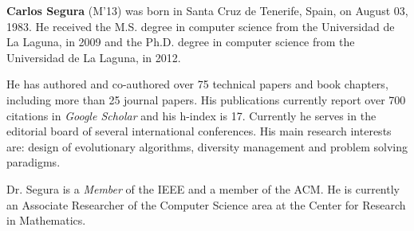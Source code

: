 \documentclass[journal]{IEEEtran}
\begin{document}




%



% 


\begin{IEEEbiography}{\bf Carlos Segura} (M'13) was born in Santa Cruz de Tenerife, Spain, on August 03, 1983.
He received the M.S. degree in computer science from the Universidad de La Laguna, in 2009 and the Ph.D. degree in computer science from the Universidad de La Laguna, in 2012.

He has authored and co-authored over 75 technical papers and book chapters, including more than 25 journal papers.
His publications currently report over 700 citations in {\em Google Scholar} and his h-index is 17. Currently he serves in the editorial board of several international conferences.
His main research interests are: design of evolutionary algorithms, diversity management and problem solving paradigms.

Dr. Segura is a {\em Member} of the IEEE and a member of the ACM. He is currently an Associate Researcher of the Computer Science area at the Center for Research in Mathematics.

\end{IEEEbiography}
\end{document}

